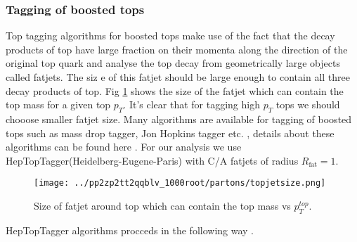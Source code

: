 \documentclass[12pt,a4paper]{article}		%
\begin{document}
\subsubsection{Tagging of boosted tops}

Top tagging algorithms for boosted tops make use of the fact that the decay products of top have large fraction on their momenta along the direction of the original top quark and analyse the top decay from geometrically large objects called fatjets. The siz e of this fatjet should be large enough to contain all three decay products of top. Fig \ref{topjetsize} shows the size of the fatjet which can contain the top mass for a given top $p_T$. It's clear that for tagging high $p_T$ tops we should chooose smaller fatjet size. Many algorithms are available for tagging of boosted tops such as mass drop tagger, Jon Hopkins tagger etc. , details about these algorithms can be found here \cite{toptaggin}. For our analysis we use HepTopTagger(Heidelberg-Eugene-Paris) \cite{heptop} with C/A fatjets of radius $R_{\text{fat}}=1$.   

\begin{figure}[h]
	\begin{centering}	
		\texttt{[image: ../pp2zp2tt2qqblv\_1000root/partons/topjetsize.png]} 
		\caption{Size of fatjet around top which can contain the top mass vs $p_T^{top}$.}
		\label{topjetsize}
		\centering
	\end{centering} 		
\end{figure}    

HepTopTagger algorithms procceds in the following way \cite{heptop}.
\end{document}
